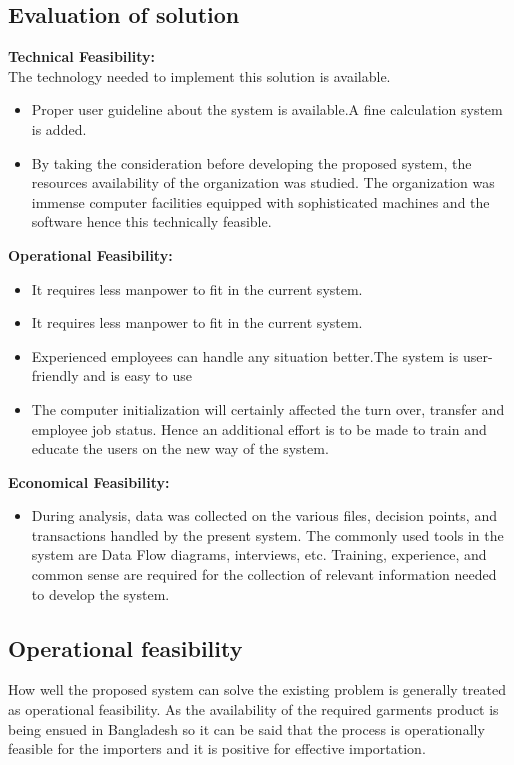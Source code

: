 \documentclass{article}
\begin{document}
\subsection{Evaluation of solution}
\textbf{ Technical Feasibility:}\\
The technology needed to implement this solution is available. 
\begin{itemize}
    \item Proper user guideline about the system is available.A fine calculation system is added.
    \item By taking the consideration before developing the proposed system, the resources availability of the organization was studied. The organization was immense computer facilities equipped with sophisticated machines and the software hence this technically feasible.
\end{itemize}

 
\textbf{Operational Feasibility:}
\begin{itemize}
    \item It requires less manpower to fit in the current system.
   \item It requires less manpower to fit in the current system. 
\item Experienced employees can handle any situation better.The system is user-friendly and is easy to use
 \item The computer initialization will certainly affected the turn over, transfer and employee job status. Hence an additional effort is to be made to train and educate the users on the new way of the system.
 \end{itemize}
 \textbf{Economical Feasibility:}
 \begin{itemize}
     \item During analysis, data was collected on the various files, decision points, and transactions handled by the present system. The commonly used tools in the system are Data Flow diagrams, interviews, etc. Training, experience, and common sense are required for the collection of relevant information needed to develop the system.
\end{itemize}
\subsection{Operational feasibility}
How well the proposed system can solve the existing problem is generally treated as operational feasibility. As the availability of the required garments product  is being ensued in Bangladesh so it can be said that the process is operationally feasible for the importers and it is positive for effective importation. 
\newpage
\end{document}
